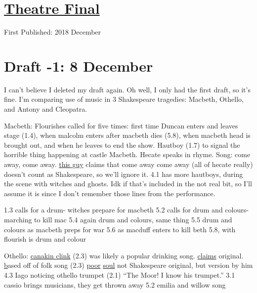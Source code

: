 \documentclass[12pt]{article}[titlepage]
\newcommand{\say}[1]{``#1''}
\newcommand{\1}{\={a}}
\newcommand{\2}{\={e}}
\newcommand{\3}{\={\i}}
\newcommand{\4}{\=o}
\newcommand{\5}{\=u}
\newcommand{\6}{\={A}}
\renewcommand{\,}{\textsuperscript{,}}
\begin{document}
\doublespacing
\section{\href{theatre-final.html}{Theatre Final}}
First Published: 2018 December 
\section{Draft -1: 8 December}
I can't believe I deleted my draft again.
Oh well, I only had the first draft, so it's fine.
I'm comparing use of music in 3 Shakespeare tragedies: Macbeth, Othello, and Antony and Cleopatra.

Macbeth:
Flourishes called for five times: first time Duncan enters and leaves stage (1.4), when malcolm enters after macbeth dies (5.8), when macbeth head is brought out, and when he leaves to end the show.
Hautboy (1.7) to signal the horrible thing happening at castle Macbeth.
Hecate speaks in rhyme.
Song: come away, come away.
\href{https://doi.org/10.1093/mq/XLVII.1.22}{this guy} claims that come away come away (all of hecate really) doesn't count as Shakespeare, so we'll ignore it.
4.1 has more hautboys, during the scene with witches and ghosts.
Idk if that's included in the not real bit, so I'll assume it is since I don't remember those lines from the performance.

1.3 calls for a drum- witches prepare for macbeth
5.2 calls for drum and colours- marching to kill mac
5.4 again drum and colours, same thing
5.5 drum and colours as macbeth preps for war
5.6 as macduff enters to kill beth
5.8, with flourish is drum and colour

Othello:
\href{https://www.shakespeare.org.uk/explore-shakespeare/blogs/shakespeares-drinking-songs/}{canakin clink} (2.3) was likely a popular drinking song. \href{http://www.lieder.net/lieder/get_text.html?TextId=18061}{claims} original.
\href{http://www.lieder.net/lieder/get_text.html?TextId=31027} based off of folk song (2.3)
\href{http://www.lieder.net/lieder/get_text.html?TextId=14898}{poor} \href{https://www.shakespeare.org.uk/explore-shakespeare/blogs/shakespeares-saddest-song/}{soul} not Shakespeare original, but version by him 4.3
Iago noticing othello trumpet (2.1) \say{The Moor! I know his trumpet.}
3.1 cassio brings musicians, they get thrown away
5.2 emilia and willow song
\end{document}
